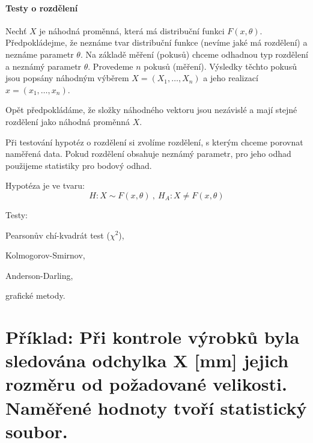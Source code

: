 \paragraph*{Testy o rozdělení}
\begin{compactitem}
    \item Nechť $X$ je náhodná proměnná, která má distribuční funkci $F(x, \theta)$. Předpokládejme, že neznáme tvar distribuční funkce (nevíme jaké má rozdělení) a neznáme parametr $\theta$. Na základě měření (pokusů) chceme odhadnou typ rozdělení a neznámý parametr $\theta$. Provedeme $n$ pokusů (měření). Výsledky těchto pokusů jsou popsány náhodným výběrem $X = ( X_1, \ldots, X_n )$ a jeho realizací $x = ( x_1 , \ldots, x_n )$.

    \item Opět předpokládáme, že složky náhodného vektoru jsou nezávislé a mají stejné rozdělení jako náhodná proměnná $X$.

    \item Při testování hypotéz o rozdělení si zvolíme rozdělení, s kterým chceme porovnat naměřená data. Pokud rozdělení obsahuje neznámý parametr, pro jeho odhad použijeme statistiky pro bodový odhad.

    \item Hypotéza je ve tvaru:
    $$ H : X \sim F ( x, \theta ) ~,~ H_A : X \not= F ( x, \theta ) $$

    \item Testy: \begin{compactitem}
        \item Pearsonův chí-kvadrát test ($\chi^2$),
        \item Kolmogorov-Smirnov,
        \item Anderson-Darling,
        \item grafické metody.
    \end{compactitem}
\end{compactitem}


\section{Příklad: Při kontrole výrobků byla sledována odchylka X [mm] jejich rozměru od požadované velikosti. Naměřené hodnoty tvoří statistický soubor.}

